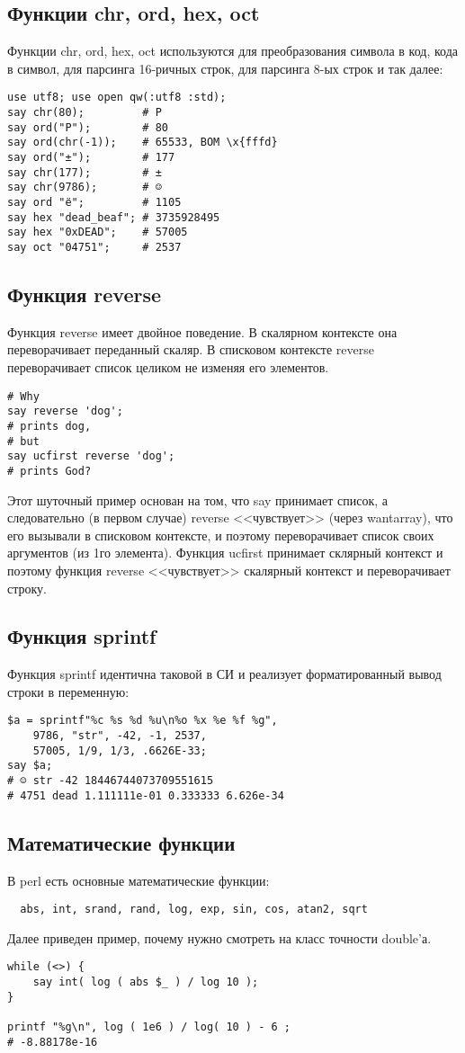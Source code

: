 \subsection{Функции chr, ord, hex, oct}
Функции chr, ord, hex, oct используются для преобразования символа в код, кода в символ, для парсинга 16-ричных строк, для парсинга 8-ых строк и так далее:
\begin{verbatim}
use utf8; use open qw(:utf8 :std);
say chr(80);         # P
say ord("P");        # 80
say ord(chr(-1));    # 65533, BOM \x{fffd}
say ord("±");        # 177
say chr(177);        # ±
say chr(9786);       # ☺
say ord "ё";         # 1105
say hex "dead_beaf"; # 3735928495
say hex "0xDEAD";    # 57005
say oct "04751";     # 2537
\end{verbatim}

\subsection{Функция reverse}
Функция reverse имеет двойное поведение. В скалярном контексте она переворачивает переданный скаляр. В списковом контексте reverse переворачивает список целиком не изменяя его элементов.
\begin{verbatim}
# Why
say reverse 'dog';
# prints dog,
# but
say ucfirst reverse 'dog';
# prints God?
\end{verbatim}

Этот шуточный пример основан на том, что say принимает список, а следовательно (в первом случае) reverse <<чувствует>> (через wantarray), что его вызывали в списковом контексте, и поэтому переворачивает список своих аргументов (из 1го элемента).  Функция ucfirst принимает склярный контекст и поэтому функция  reverse <<чувствует>> скалярный контекст и переворачивает строку.

\subsection{Функция sprintf}
Функция sprintf идентична таковой в СИ и реализует форматированный вывод строки в переменную:
\begin{verbatim}
$a = sprintf"%c %s %d %u\n%o %x %e %f %g",
    9786, "str", -42, -1, 2537,
    57005, 1/9, 1/3, .6626E-33;
say $a;
# ☺ str -42 18446744073709551615
# 4751 dead 1.111111e-01 0.333333 6.626e-34
\end{verbatim}

\subsection{Математические функции}
В perl есть основные математические функции:
\begin{verbatim}
  abs, int, srand, rand, log, exp, sin, cos, atan2, sqrt
\end{verbatim}
Далее приведен пример, почему нужно смотреть на класс точности double'а.
\begin{verbatim}
while (<>) {
    say int( log ( abs $_ ) / log 10 );
}

printf "%g\n", log ( 1e6 ) / log( 10 ) - 6 ;
# -8.88178e-16
\end{verbatim}

